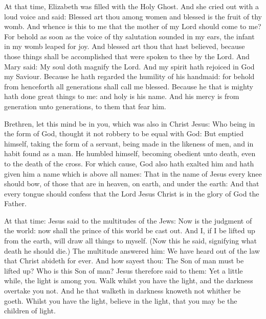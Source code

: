 
At that time, Elizabeth was filled with the
Holy Ghost.
And she cried out with a loud voice and said: Blessed art thou
among women and blessed is the fruit of thy womb.
And whence is this to me that the mother of my Lord should come to
me?
For behold as soon as the voice of thy salutation sounded in my
ears, the infant in my womb leaped for joy.
And blessed art thou that hast believed, because those things
shall be accomplished that were spoken to thee by the Lord.
And Mary said: My soul doth magnify the Lord.
And my spirit hath rejoiced in God my Saviour.
Because he hath regarded the humility of his handmaid: for behold
from henceforth all generations shall call me blessed.
Because he that is mighty hath done great things to me: and holy
is his name.
And his mercy is from generation unto generations, to them that
fear him.








Brethren, let this mind be in you, which was also in Christ Jesus: Who being in the
form of God, thought it not robbery to be equal with God: But emptied himself,
taking the form of a servant, being made in the likeness of men, and in habit
found as a man.
  He humbled
himself, becoming obedient unto death, even to the death of the cross.  For
which cause, God also hath exalted him and hath given him a name which is above
all names: That in the name of Jesus every knee should bow, of those that are
in heaven, on earth, and under the earth: And that every tongue should confess
that the Lord Jesus Christ is in the glory of God the Father.



At that time: Jesus said to the multitudes of the Jews:
Now is the judgment of the world: now shall the prince of this
world be cast out.
And I, if I be lifted up from the earth, will draw all things to
myself.
(Now this he said, signifying what death he should die.)
The multitude answered him: We have heard out of the law that
Christ abideth for ever. And how sayest thou: The Son of man must be
lifted up? Who is this Son of man?
Jesus therefore said to them: Yet a little while, the light is
among you. Walk whilst you have the light, and the darkness overtake you
not. And he that walketh in darkness knoweth not whither be goeth.
Whilst you have the light, believe in the light, that you may be
the children of light. %



